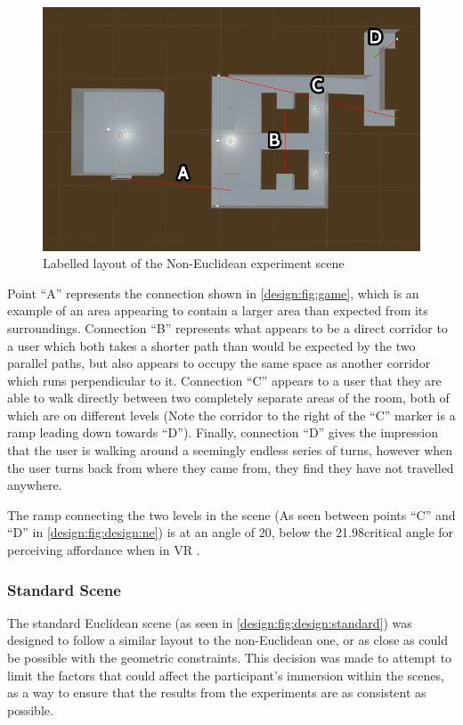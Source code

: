			\begin{figure}[h]
				\includegraphics[width=1\textwidth]{Images/NE_Layout}
				\centering
				\caption{Labelled layout of the Non-Euclidean experiment scene}
				\label{design:fig:design:ne}
			\end{figure}

			Point \enquote{A} represents the connection shown in \autoref{design:fig:game}, which is an example of an area appearing to contain a larger area than expected from its surroundings.
			Connection \enquote{B} represents what appears to be a direct corridor to a user which both takes a shorter path than would be expected by the two parallel paths, but also appears to occupy the same space as another corridor which runs perpendicular to it.
			Connection \enquote{C} appears to a user that they are able to walk directly between two completely separate areas of the room, both of which are on different levels (Note the corridor to the right of the \enquote{C} marker is a ramp leading down towards \enquote{D}).
			Finally, connection \enquote{D} gives the impression that the user is walking around a seemingly endless series of turns, however when the user turns back from where they came from, they find they have not travelled anywhere.

			The ramp connecting the two levels in the scene (As seen between points \enquote{C} and \enquote{D} in \autoref{design:fig:design:ne}) is at an angle of 20\degree, below the 21.98\degree critical angle for perceiving affordance when in VR \cite{Regia-Corte2012}.

		\subsubsection{Standard Scene}
			The standard Euclidean scene (as seen in \autoref{design:fig:design:standard}) was designed to follow a similar layout to the non-Euclidean one, or as close as could be possible with the geometric constraints.
			This decision was made to attempt to limit the factors that could affect the participant's immersion within the scenes, as a way to ensure that the results from the experiments are as consistent as possible.

